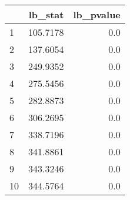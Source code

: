 \begin{tabular}{lrr}
\toprule
{} &   lb\_stat &  lb\_pvalue \\
\midrule
1  &  105.7178 &        0.0 \\
2  &  137.6054 &        0.0 \\
3  &  249.9352 &        0.0 \\
4  &  275.5456 &        0.0 \\
5  &  282.8873 &        0.0 \\
6  &  306.2695 &        0.0 \\
7  &  338.7196 &        0.0 \\
8  &  341.8861 &        0.0 \\
9  &  343.3246 &        0.0 \\
10 &  344.5764 &        0.0 \\
\bottomrule
\end{tabular}
